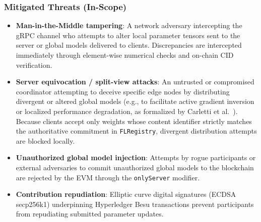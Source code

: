 \subsubsection{Mitigated Threats (In-Scope)}
\begin{itemize}
    \item \textbf{Man-in-the-Middle tampering}: A network adversary intercepting the gRPC channel who attempts to alter local parameter tensors sent to the server or global models delivered to clients. Discrepancies are intercepted immediately through element-wise numerical checks and on-chain CID verification.
    \item \textbf{Server equivocation / split-view attacks}: An untrusted or compromised coordinator attempting to deceive specific edge nodes by distributing divergent or altered global models (e.g., to facilitate active gradient inversion or localized performance degradation, as formalized by Carletti et al.~\cite{carletti2026detectability}). Because clients accept only weights whose content identifier strictly matches the authoritative commitment in \texttt{FLRegistry}, divergent distribution attempts are blocked locally.
    \item \textbf{Unauthorized global model injection}: Attempts by rogue participants or external adversaries to commit unauthorized global models to the blockchain are rejected by the EVM through the \texttt{onlyServer} modifier.
    \item \textbf{Contribution repudiation}: Elliptic curve digital signatures (ECDSA secp256k1) underpinning Hyperledger Besu transactions prevent participants from repudiating submitted parameter updates.
\end{itemize}

